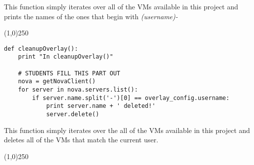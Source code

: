 \documentclass[12pt]{article}
\begin{document}
This function simply iterates over all of the VMs available in this project and prints the names of the ones that begin with \textit{(username)-}


\begin{center}
	\line(1,0){250}
\end{center}
\begin{verbatim}
def cleanupOverlay():
    print "In cleanupOverlay()"

    # STUDENTS FILL THIS PART OUT
    nova = getNovaClient()
    for server in nova.servers.list():
        if server.name.split('-')[0] == overlay_config.username:
            print server.name + ' deleted!'
            server.delete()
\end{verbatim}

This function simply iterates over the all of the VMs available in this project and deletes all of the VMs that match the current user.

\begin{center}
	\line(1,0){250}
\end{center}




 
 
\end{document}

